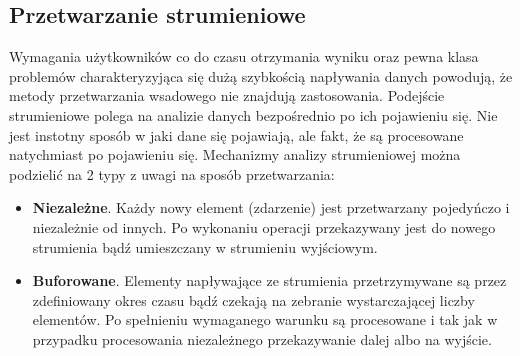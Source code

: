 
\subsection{Przetwarzanie strumieniowe}

Wymagania użytkowników co do czasu otrzymania wyniku
oraz pewna klasa problemów charakteryzyjąca się dużą szybkością napływania danych powodują,
że metody przetwarzania wsadowego nie znajdują zastosowania.
Podejście strumieniowe polega na analizie danych bezpośrednio po ich pojawieniu się.
Nie jest instotny sposób w jaki dane się pojawiają,
ale fakt,
że są procesowane natychmiast po pojawieniu się.
Mechanizmy analizy strumieniowej można podzielić na 2 typy z uwagi na sposób przetwarzania:
\begin{itemize}
	\item \textbf{Niezależne}.
	Każdy nowy element (zdarzenie) jest przetwarzany pojedyńczo i niezależnie od innych.
	Po wykonaniu operacji przekazywany jest do nowego strumienia bądź umieszczany w strumieniu wyjściowym.
	\item \textbf{Buforowane}.
	Elementy napływające ze strumienia przetrzymywane są przez zdefiniowany okres czasu
	bądź czekają na zebranie wystarczającej liczby elementów.
	Po spełnieniu wymaganego warunku są procesowane
	i tak jak w przypadku procesowania niezależnego	przekazywanie dalej albo na wyjście.
\end{itemize}

